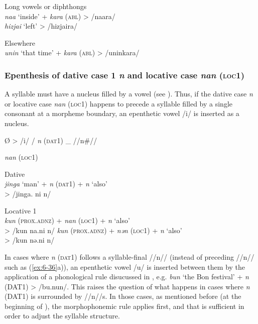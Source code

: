\ex Long vowels or diphthongs  \\
    \textit{naa}  ‘inside’  +  \textit{kara} (\textsc{abl})  >  /naara/\\
    \textit{hizjai}  ‘left’      >  /hizjaira/  

\ex  Elsewhere\\
\textit{unin}  ‘that time’  +  \textit{kara} (\textsc{abl})  >  /uninkara/\\

\subsubsection{Epenthesis of dative case 1 \textit{n} and locative case \textit{nan} (\textsc{loc1})}

A syllable must have a nucleus filled by a vowel (see ). Thus, if the dative case \textit{n} or locative case \textit{nan} (\textsc{loc1}) happens to precede a syllable filled by a single consonant at a morpheme boundary, an epenthetic vowel /i/ is inserted as a nucleus.

\ea\label{ex:6-35}
  Ø  >  /i/  /  %
  \textit{n}  %
(\textsc{dat}1)    \_  //n\#//

            \textit{nan}  (\textsc{loc1})

\ea\label{ex:6-36}
 \ea Dative\\
    \textit{jinga}  ‘man’  +  \textit{n}  (\textsc{dat}1)  +  \textit{n}  ‘also’\\
  >  /jinga.      ni      n/  

\ex Locative 1\\
\ea  \textit{kun}  (\textsc{prox}.\textsc{adnz})  +  \textit{nan}  (\textsc{loc1})  +  \textit{n}  ‘also’\\
  >  /kun      na.ni      n/  
  \ex  \textit{kun}  (\textsc{prox}.\textsc{adnz})  +  \textit{nən}  (\textsc{loc1})  +  \textit{n}  ‘also’\\
  >  /kun      nə.ni      n/  
\z
\z
\z

In cases where \textit{n} (\textsc{dat}1) follows a syllable-final //n// (instead of preceding //n// such as (\ref{ex:6-36}a)), an epenthetic vowel /u/ is inserted between them by the application of a phonological rule disucussed in , e.g. \textit{bun} ‘the Bon festival’ + \textit{n} (DAT1) > /bu.nun/. This raises the question of what happens in cases where \textit{n} (DAT1) is surrounded by //n//s. In those cases, as mentioned before (at the beginning of ), the morphophonemic rule  applies first, and that is sufficient in order to adjust the syllable structure.

